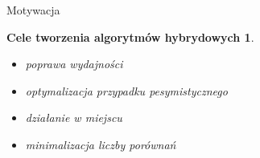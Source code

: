\begin{frame}[squeeze]{Motywacja}

	\newtheorem*{sortimporove*}{Cele tworzenia algorytmów hybrydowych}
	\begin{sortimporove*}
		\begin{itemize}
			\item poprawa wydajności
			\item optymalizacja przypadku pesymistycznego
			\item działanie w miejscu
			\item minimalizacja liczby porównań
		\end{itemize}
	\end{sortimporove*}

\end{frame}